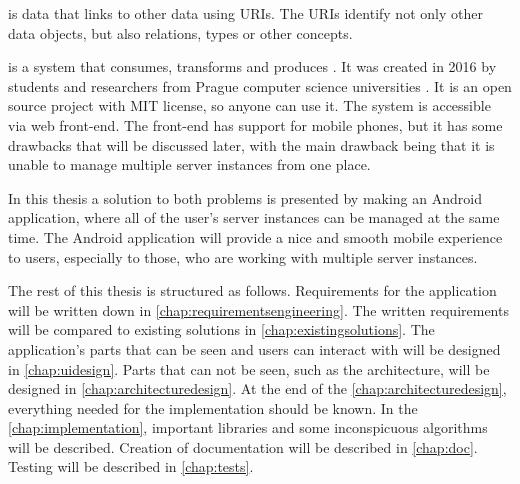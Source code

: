 \ld{} is data that links to other data using URIs.
The URIs identify not only other data objects, but also relations, types or other concepts. \cite{linkeddata}

\etl{} is a system that consumes, transforms and produces \ld{}.
It was created in 2016 by students and researchers from Prague computer science universities \cite{etlpublication}.
It is an open source project \cite{etl} with MIT license, so anyone can use it.
The system is accessible via web front-end.
The front-end has support for mobile phones, but it has some drawbacks that will be discussed later, with the main drawback being that it is unable to manage multiple server instances from one place.

In this thesis a solution to both problems is presented by making an Android application, where all of the user's \etl{} server instances can be managed at the same time.
The Android application will provide a nice and smooth mobile experience to \etl{} users, especially to those, who are working with multiple server instances.

The rest of this thesis is structured as follows.
Requirements for the application will be written down in \autoref{chap:requirementsengineering}.
The written requirements will be compared to existing solutions in \autoref{chap:existingsolutions}.
The application's parts that can be seen and users can interact with will be designed in \autoref{chap:uidesign}.
Parts that can not be seen, such as the architecture, will be designed in \autoref{chap:architecturedesign}.
At the end of the \autoref{chap:architecturedesign}, everything needed for the implementation should be known.
In the \autoref{chap:implementation}, important libraries and some inconspicuous algorithms will be described.
Creation of documentation will be described in \autoref{chap:doc}.
Testing will be described in \autoref{chap:tests}.
